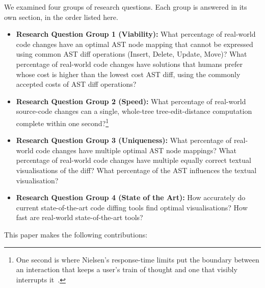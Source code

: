 \documentclass[sigconf]{acmart}
\begin{document}
We examined four groups of research questions. Each group is answered in its own section, in
the order listed here.

\begin{itemize}
  \item \textbf{Research Question Group 1 (Viability):} What percentage of real-world
    code changes have an optimal AST node mapping that cannot be expressed using common AST diff
    operations (Insert, Delete, Update, Move)? What percentage of real-world code changes
    have solutions that humans prefer whose cost is higher than the lowest cost AST diff, using
    the commonly accepted costs of AST diff operations?
  \item \textbf{Research Question Group 2 (Speed):} What percentage of real-world
    source-code changes can a single, whole-tree tree-edit-distance computation complete within one
    second?\footnote{One second is where Nielsen's response-time limits put the boundary between an
    interaction that keeps a user's train of thought and one that visibly interrupts
    it~\cite{nielsen-usability}.}
  \item \textbf{Research Question Group 3 (Uniqueness):} What percentage of real-world
    code changes have multiple optimal AST node mappings? What percentage of real-world
    code changes have multiple equally correct textual visualisations of the diff? What
    percentage of the AST influences the textual visualisation?
  \item \textbf{Research Question Group 4 (State of the Art):} How accurately do current
    state-of-the-art code diffing tools find optimal visualisations? How fast are
    real-world state-of-the-art tools?
\end{itemize}

This paper makes the following contributions:
\end{document}
